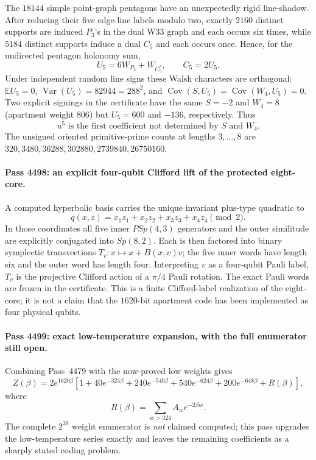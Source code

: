 The $18144$ simple point-graph pentagons have an unexpectedly rigid line-shadow.
After reducing their five edge-line labels modulo two, exactly $2160$ distinct
supports are induced $P_3$'s in the dual W33 graph and each occurs six times,
while $5184$ distinct supports induce a dual $C_5$ and each occurs once.  Hence,
for the undirected pentagon holonomy sum,
\[
  \boxed{U_5=6W_{P_3}+W_{C_5^*},\qquad C_5=2U_5.}
\]
Under independent random line signs these Walsh characters are orthogonal:
$\mathbb E U_5=0$, $\operatorname{Var}(U_5)=82944=288^2$, and
$\operatorname{Cov}(S,U_5)=\operatorname{Cov}(W_4,U_5)=0$.
Two explicit signings in the certificate have the same $S=-2$ and $W_4=8$
(apartment weight $806$) but $U_5=600$ and $-136$, respectively.  Thus
\[
  \boxed{u^5\text{ is the first coefficient not determined by }S\text{ and }W_4.}
\]
The unsigned oriented primitive-prime counts at lengths $3,\ldots,8$ are
$320,3480,36288,302880,2739840,26750160$.

\paragraph{Pass 4498: an explicit four-qubit Clifford lift of the protected eight-core.}
A computed hyperbolic basis carries the unique invariant plus-type quadratic to
\[
  \boxed{q(x,z)=x_1z_1+x_2z_2+x_3z_3+x_4z_4\pmod2.}
\]
In those coordinates all five inner $PSp(4,3)$ generators and the outer
similitude are explicitly conjugated into $Sp(8,2)$.  Each is then factored into
binary symplectic transvections $T_v:x\mapsto x+B(x,v)v$; the five inner words
have length six and the outer word has length four.  Interpreting $v$ as a
four-qubit Pauli label, $T_v$ is the projective Clifford action of a $\pi/4$
Pauli rotation.  The exact Pauli words are frozen in the certificate.  This is a
finite Clifford-label realization of the eight-core; it is not a claim that the
$1620$-bit apartment code has been implemented as four physical qubits.

\paragraph{Pass 4499: exact low-temperature expansion, with the full enumerator still open.}
Combining Pass~4479 with the now-proved low weights gives
\[
 Z(\beta)=2e^{1620\beta}\!\left[
 1+40e^{-324\beta}+240e^{-540\beta}+540e^{-624\beta}
 +200e^{-648\beta}+R(\beta)\right],
\]
where
\[
 R(\beta)=\sum_{w>324}A_w e^{-2\beta w}.
\]
The complete $2^{39}$ weight enumerator is \emph{not} claimed computed; this
pass upgrades the low-temperature series exactly and leaves the remaining
coefficients as a sharply stated coding problem.

